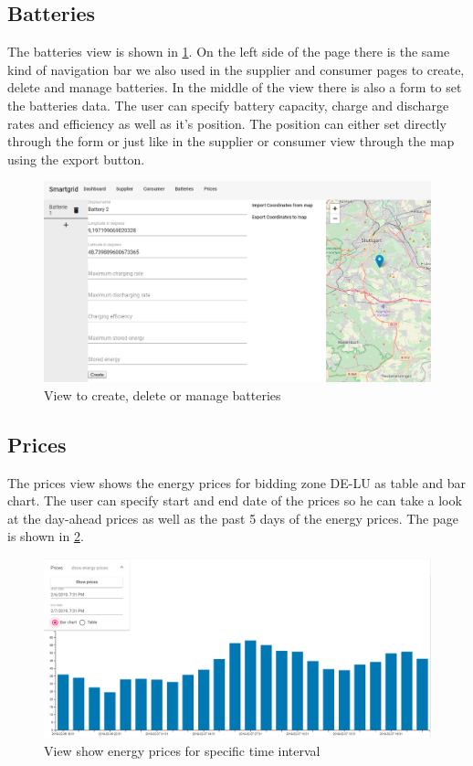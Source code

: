 \subsection{Batteries}
The batteries view is shown in \cref{fig:batteries}.
On the left side of the page there is the same kind of navigation bar we also used in the supplier and consumer pages to create, delete and manage batteries.
In the middle of the view there is also a form to set the batteries data.
The user can specify battery capacity, charge and discharge rates and efficiency as well as it's position.
The position can either set directly through the form or just like in the supplier or consumer view through the map using the export button.

\begin{figure}[!h]
    \centering
    \includegraphics[width=1.00\textwidth]{../figures/batteriesView.PNG}
    \caption{View to create, delete or manage batteries}
    \label{fig:batteries}
\end{figure}


\subsection{Prices}
The prices view shows the energy prices for bidding zone DE-LU as table and bar chart.
The user can specify start and end date of the prices so he can take a look at the day-ahead prices as well as the past 5 days of the energy prices.
The page is shown in \cref{fig:prices}.

\begin{figure}[!h]
    \centering
\includegraphics[width=1.00\textwidth]{../figures/prices.PNG}
    \caption{View show energy prices for specific time interval}
    \label{fig:prices}
\end{figure}

